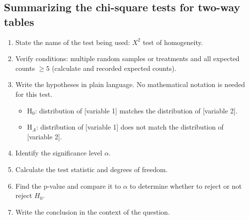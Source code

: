\subsection{Summarizing the chi-square tests for two-way tables\vspace{-3mm}}

\begin{termBox}{
\begin{enumerate}
\setlength{\itemsep}{0mm}
\item State the name of the test being used: $X^2$ test of homogeneity.
\item Verify conditions: multiple random samples or treatments and all expected counts $\ge 5$ (calculate and recorded expected counts).
\item Write the hypotheses in plain language. No mathematical notation is needed for this test.\vspace{-2mm}
\begin{itemize}
\item H$_0$: distribution of [variable 1] matches the distribution of [variable 2].
\item H$_A$: distribution of [variable 1] does not match the distribution of [variable 2].
\end{itemize}
\item Identify the significance level $\alpha$.
\item Calculate the test statistic and degrees of freedom.%
\item Find the p-value and compare it to $\alpha$ to determine whether to reject or not reject $H_0$.
\item Write the conclusion in the context of the question.
\end{enumerate}}
\end{termBox}

